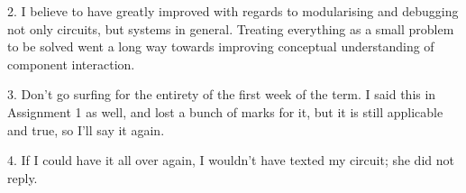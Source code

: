 2. I believe to have greatly improved with regards to modularising and debugging not only circuits, but systems in general. Treating everything as a small problem to be solved went a long way towards improving conceptual understanding of component interaction.

3. Don't go surfing for the entirety of the first week of the term. I said this in Assignment 1 as well, and lost a bunch of marks for it, but it is still applicable and true, so I'll say it again.

4. If I could have it all over again, I wouldn't have texted my circuit; she did not reply.